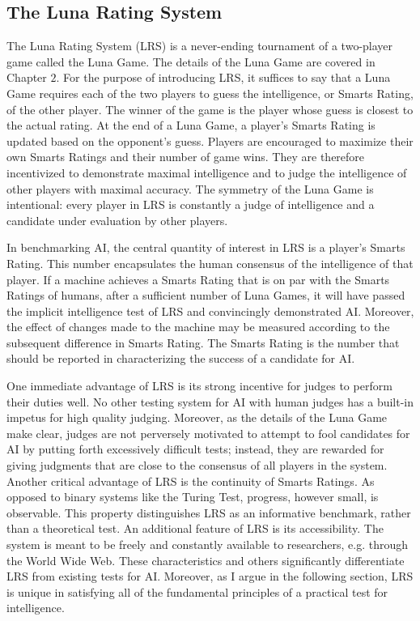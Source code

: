 \subsection{The Luna Rating System}

The Luna Rating System (LRS) is a never-ending tournament of a two-player game called the Luna Game. The details of the Luna Game are covered in Chapter $2$. For the purpose of introducing LRS, it suffices to say that a Luna Game requires each of the two players to guess the intelligence, or Smarts Rating, of the other player. The winner of the game is the player whose guess is closest to the actual rating. At the end of a Luna Game, a player's Smarts Rating is updated based on the opponent's guess. Players are encouraged to maximize their own Smarts Ratings and their number of game wins. They are therefore incentivized to demonstrate maximal intelligence and to judge the intelligence of other players with maximal accuracy. The symmetry of the Luna Game is intentional: every player in LRS is constantly a judge of intelligence and a candidate under evaluation by other players.

In benchmarking AI, the central quantity of interest in LRS is a player's Smarts Rating. This number encapsulates the human consensus of the intelligence of that player. If a machine achieves a Smarts Rating that is on par with the Smarts Ratings of humans, after a sufficient number of Luna Games, it will have passed the implicit intelligence test of LRS and convincingly demonstrated AI. Moreover, the effect of changes made to the machine may be measured according to the subsequent difference in Smarts Rating. The Smarts Rating is the number that should be reported in characterizing the success of a candidate for AI.

One immediate advantage of LRS is its strong incentive for judges to perform their duties well. No other testing system for AI with human judges has a built-in impetus for high quality judging. Moreover, as the details of the Luna Game make clear, judges are not perversely motivated to attempt to fool candidates for AI by putting forth excessively difficult tests; instead, they are rewarded for giving judgments that are close to the consensus of all players in the system. Another critical advantage of LRS is the continuity of Smarts Ratings. As opposed to binary systems like the Turing Test, progress, however small, is observable. This property distinguishes LRS as an informative benchmark, rather than a theoretical test. An additional feature of LRS is its accessibility. The system is meant to be freely and constantly available to researchers, e.g. through the World Wide Web. These characteristics and others significantly differentiate LRS from existing tests for AI. Moreover, as I argue in the following section, LRS is unique in satisfying all of the fundamental principles of a practical test for intelligence.

